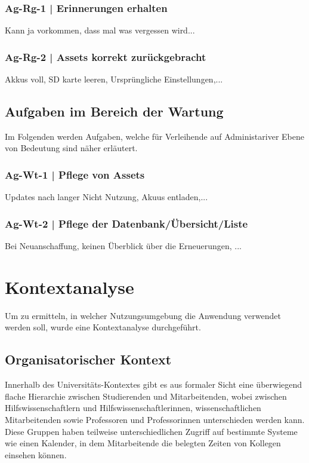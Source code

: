 \subsubsection*{Ag-Rg-1 | Erinnerungen erhalten}
Kann ja vorkommen, dass mal was vergessen wird...
\subsubsection*{Ag-Rg-2 | Assets korrekt zurückgebracht}
Akkus voll, SD karte leeren, Ursprüngliche Einstellungen,...

\subsection*{Aufgaben im Bereich der Wartung}
Im Folgenden werden Aufgaben, welche für Verleihende auf Administariver Ebene von Bedeutung sind
näher erläutert. 

\subsubsection*{Ag-Wt-1 | Pflege von Assets}
Updates nach langer Nicht Nutzung, Akuus entladen,...

\subsubsection*{Ag-Wt-2 | Pflege der Datenbank/Übersicht/Liste}
Bei Neuanschaffung, keinen Überblick über die Erneuerungen, ...



\section{Kontextanalyse}
\label{section:kontext}

Um zu ermitteln, in welcher Nutzungsumgebung die Anwendung verwendet werden soll, wurde eine
Kontextanalyse durchgeführt.

\subsection*{Organisatorischer Kontext}
Innerhalb des Universitäts-Kontextes gibt es aus formaler Sicht eine überwiegend flache Hierarchie
zwischen Studierenden und Mitarbeitenden, wobei zwischen Hilfswissenschaftlern und
Hilfswissenschaftlerinnen, wissenschaftlichen Mitarbeitenden sowie Professoren und Professorinnen
unterschieden werden kann. Diese Gruppen haben teilweise unterschiedlichen Zugriff auf bestimmte
Systeme wie einen Kalender, in dem Mitarbeitende die belegten Zeiten von Kollegen einsehen können.

